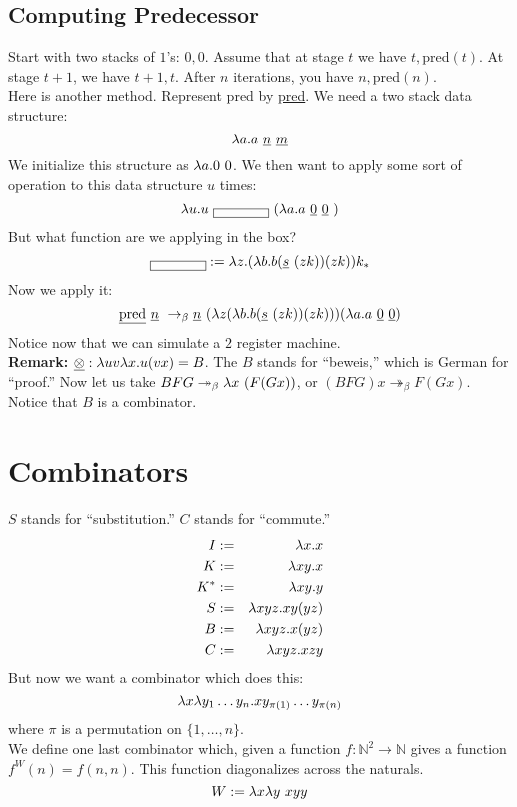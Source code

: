 \subsection{Computing Predecessor}
Start with two stacks of $1$'s: $0,0$. Assume that at stage $t$ we have $t,$pred$(t)$. At stage $t + 1$, we have $t + 1, t$. After $n$ iterations, you have $n,$pred$(n)$.\\

Here is another method. Represent pred by \uline{pred}. We need a two stack data structure:
\begin{equation*}
  \l a . a\ \uline{n}\ \uline{m}
\end{equation*}
We initialize this structure as $\lambda a.0\ 0$. We then want to apply some sort of operation to this data structure $u$ times:
\begin{equation*}
  \l u . u\ \boxed{\hphantom{Oh, god}}\ (\l a . a\ \uline{0}\ \uline{0}\ )
\end{equation*}
But what function are we applying in the box?
\begin{equation*}
  \boxed{\hphantom{Oh, god}} := \l z . (\l b . b (\uline{s}\ (zk))(zk))k_*
\end{equation*}
Now we apply it:
\begin{equation*}
  \uline{\hbox{pred}}\ \uline{n}\ \rightarrow_\beta \uline{n}\ (\l z (\l b . b(\uline{s}\ (zk))(zk)))(\l a . a\ \uline{0}\ \uline{0})
\end{equation*}
Notice now that we can simulate a $2$ register machine.\\

\textbf{Remark:} $\uline{\otimes} : \l uv\l x . u(vx) = B$. The $B$ stands for ``beweis,'' which is German for ``proof.'' Now let us take $BFG \twoheadrightarrow_\beta \lambda x\ (F(Gx))$, or $(BFG)x \twoheadrightarrow_\beta F(Gx)$. Notice that $B$ is a combinator.

\section{Combinators}
$S$ stands for ``substitution.'' $C$ stands for ``commute.''
\begin{eqnarray*}
  I &:=& \lambda x . x\\
  K &:=& \lambda xy . x\\
  K^* &:=& \lambda xy . y\\
  S &:=& \lambda xyz . xy(yz)\\
  B &:=& \lambda xyz . x(yz)\\
  C &:=& \lambda xyz . xzy\\
\end{eqnarray*}
But now we want a combinator which does this:
\begin{equation*}
  \lambda x \lambda y_1 \ldots y_n . x y_{\pi(1)} \ldots y_{\pi(n)}
\end{equation*}
where $\pi$ is a permutation on $\{1,\ldots,n\}$.\\

We define one last combinator which, given a function $f: \mathbb{N}^2 \rightarrow \mathbb{N}$ gives a function $f^W(n) = f(n,n)$. This function diagonalizes across the naturals.
\begin{equation*}
  W := \lambda x \lambda y \ xyy
\end{equation*}